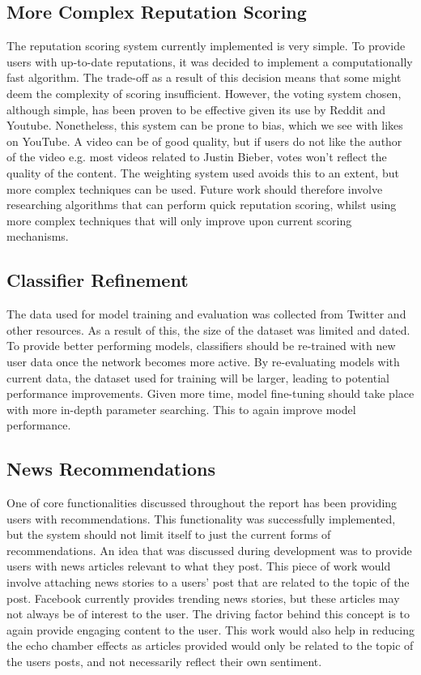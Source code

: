 \subsection{More Complex Reputation Scoring}
The reputation scoring system currently implemented is very simple. To provide users with up-to-date reputations, it was decided to implement a computationally fast algorithm. The trade-off as a result of this decision means that some might deem the complexity of scoring insufficient. However, the voting system chosen, although simple, has been proven to be effective given its use by Reddit and Youtube. Nonetheless, this system can be prone to bias, which we see with likes on YouTube. A video can be of good quality, but if users do not like the author of the video e.g. most videos related to Justin Bieber, votes won't reflect the quality of the content. The weighting system used avoids this to an extent, but more complex techniques can be used. Future work should therefore involve researching algorithms that can perform quick reputation scoring, whilst using more complex techniques that will only improve upon current scoring mechanisms.

\subsection{Classifier Refinement}
The data used for model training and evaluation was collected from Twitter and other resources. As a result of this, the size of the dataset was limited and dated. To provide better performing models, classifiers should be re-trained with new user data once the network becomes more active. By re-evaluating models with current data, the dataset used for training will be larger, leading to potential performance improvements. Given more time, model fine-tuning should take place with more in-depth parameter searching. This to again improve model performance.

\subsection{News Recommendations}
One of core functionalities discussed throughout the report has been providing users with recommendations. This functionality was successfully implemented, but the system should not limit itself to just the current forms of recommendations. An idea that was discussed during development was to provide users with news articles relevant to what they post.
This piece of work would involve attaching news stories to a users' post that are related to the topic of the post. Facebook currently provides trending news stories, but these articles may not always be of interest to the user. The driving factor behind this concept is to again provide engaging content to the user. This work would also help in reducing the echo chamber effects as articles provided would only be related to the topic of the users posts, and not necessarily reflect their own sentiment.

